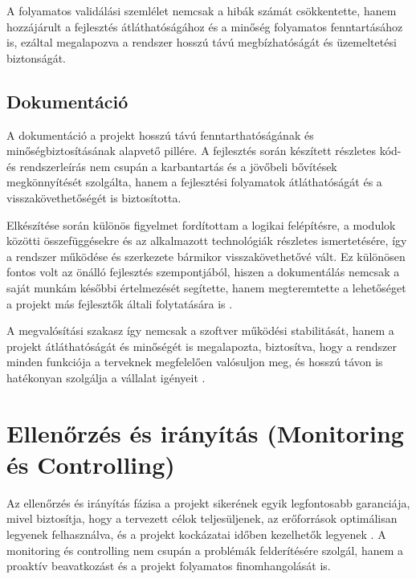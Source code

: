 A folyamatos validálási szemlélet nemcsak a hibák számát csökkentette, hanem hozzájárult a fejlesztés átláthatóságához és a minőség folyamatos fenntartásához is,  
ezáltal megalapozva a rendszer hosszú távú megbízhatóságát és üzemeltetési biztonságát.

\subsection{Dokumentáció}

A dokumentáció a projekt hosszú távú fenntarthatóságának és minőségbiztosításának alapvető pillére.  
A fejlesztés során készített részletes kód- és rendszerleírás nem csupán a karbantartás és a jövőbeli bővítések megkönnyítését szolgálta,  
hanem a fejlesztési folyamatok átláthatóságát és a visszakövethetőségét is biztosította.  

Elkészítése során különös figyelmet fordítottam a logikai felépítésre, a modulok közötti összefüggésekre és az alkalmazott technológiák 
részletes ismertetésére, így a rendszer működése és szerkezete bármikor visszakövethetővé vált. 
Ez különösen fontos volt az önálló fejlesztés szempontjából, hiszen a dokumentálás nemcsak a saját munkám későbbi értelmezését segítette,  
hanem megteremtette a lehetőséget a projekt más fejlesztők általi folytatására is \cite{Kovacs2016,Kaposi2019,Szalay2018}.  

A megvalósítási szakasz így nemcsak a szoftver működési stabilitását, hanem a projekt átláthatóságát és minőségét is megalapozta,  
biztosítva, hogy a rendszer minden funkciója a terveknek megfelelően valósuljon meg, és hosszú távon is hatékonyan szolgálja a vállalat igényeit \cite{Hajdu2014}.

\section{Ellenőrzés és irányítás (Monitoring és Controlling)}

Az ellenőrzés és irányítás fázisa a projekt sikerének egyik legfontosabb garanciája, mivel biztosítja, 
hogy a tervezett célok teljesüljenek, az erőforrások optimálisan legyenek felhasználva, 
és a projekt kockázatai időben kezelhetők legyenek \cite{Hajdu2014,Szalay2018,Kovacs2016,Kaposi2019}. 
A monitoring és controlling nem csupán a problémák felderítésére szolgál, 
hanem a proaktív beavatkozást és a projekt folyamatos finomhangolását is.

